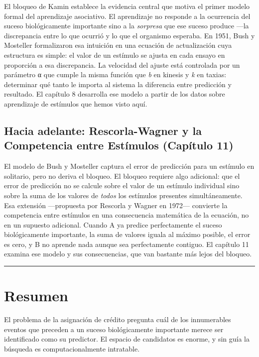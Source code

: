 \documentclass[
  letterpaper,
  DIV=11,
  numbers=noendperiod]{scrreprt}
\begin{document}
\begin{tcolorbox}[enhanced jigsaw, toprule=.15mm, arc=.35mm, colback=white, opacityback=0, colframe=quarto-callout-note-color-frame, breakable, rightrule=.15mm, left=2mm, leftrule=.75mm, bottomrule=.15mm]
El bloqueo de Kamin establece la evidencia central que motiva el primer
modelo formal del aprendizaje asociativo. El aprendizaje no responde a
la ocurrencia del suceso biológicamente importante sino a la
\emph{sorpresa} que ese suceso produce ---la discrepancia entre lo que
ocurrió y lo que el organismo esperaba. En 1951, Bush y Mosteller
formalizaron esa intuición en una ecuación de actualización cuya
estructura es simple: el valor de un estímulo se ajusta en cada ensayo
en proporción a esa discrepancia. La velocidad del ajuste está
controlada por un parámetro α que cumple la misma función que \emph{b}
en kinesis y \emph{k} en taxias: determinar qué tanto le importa al
sistema la diferencia entre predicción y resultado. El capítulo 8
desarrolla ese modelo a partir de los datos sobre aprendizaje de
estímulos que hemos visto aquí.

\subsection{Hacia adelante: Rescorla-Wagner y la Competencia entre
Estímulos (Capítulo
11)}\label{hacia-adelante-rescorla-wagner-y-la-competencia-entre-estuxedmulos-capuxedtulo-11}

El modelo de Bush y Mosteller captura el error de predicción para un
estímulo en solitario, pero no deriva el bloqueo. El bloqueo requiere
algo adicional: que el error de predicción no se calcule sobre el valor
de un estímulo individual sino sobre la suma de los valores de
\emph{todos} los estímulos presentes simultáneamente. Esa extensión
---propuesta por Rescorla y Wagner en 1972--- convierte la competencia
entre estímulos en una consecuencia matemática de la ecuación, no en un
supuesto adicional. Cuando A ya predice perfectamente el suceso
biológicamente importante, la suma de valores iguala al máximo posible,
el error es cero, y B no aprende nada aunque sea perfectamente contiguo.
El capítulo 11 examina ese modelo y sus consecuencias, que van bastante
más lejos del bloqueo.

\begin{center}\rule{0.5\linewidth}{0.5pt}\end{center}

\section{Resumen}\label{resumen-2}

El problema de la asignación de crédito pregunta cuál de los
innumerables eventos que preceden a un suceso biológicamente importante
merece ser identificado como su predictor. El espacio de candidatos es
enorme, y sin guía la búsqueda es computacionalmente intratable.


\end{tcolorbox}
\end{document}
